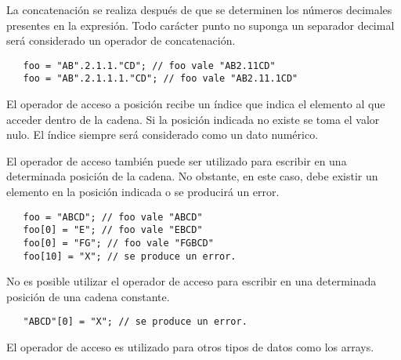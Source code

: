 La concatenación se realiza después de que se determinen los números decimales presentes en la 
expresión. Todo carácter punto no suponga un separador decimal será considerado un operador
de concatenación.\\  

\begin{lstlisting}
   foo = "AB".2.1.1."CD"; // foo vale "AB2.11CD"
   foo = "AB".2.1.1.1."CD"; // foo vale "AB2.11.1CD"
\end{lstlisting} 

El operador de acceso a posición recibe un índice que indica el elemento al que acceder dentro de la 
cadena. Si la posición indicada no existe se toma el valor nulo. El índice siempre será considerado como un 
dato numérico.

El operador de acceso también puede ser utilizado para escribir en una determinada posición de la cadena.
No obstante, en este caso, debe existir un elemento en la posición indicada o se producirá un error. \\

\begin{lstlisting}
   foo = "ABCD"; // foo vale "ABCD"
   foo[0] = "E"; // foo vale "EBCD"
   foo[0] = "FG"; // foo vale "FGBCD"
   foo[10] = "X"; // se produce un error.
\end{lstlisting} 

No es posible utilizar el operador de acceso para escribir en una determinada posición de una cadena constante. \\

\begin{lstlisting}
   "ABCD"[0] = "X"; // se produce un error.
\end{lstlisting} 

El operador de acceso es utilizado para otros tipos de datos como los arrays.


